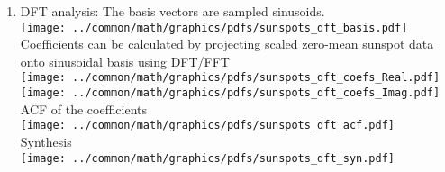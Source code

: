 \begin{example}
\begin{enumerate}
\item DFT analysis: The basis vectors are sampled sinusoids.
\\\texttt{[image: ../common/math/graphics/pdfs/sunspots\_dft\_basis.pdf]}
\\Coefficients can be calculated by projecting scaled zero-mean sunspot data onto sinusoidal basis using DFT/FFT
\\\texttt{[image: ../common/math/graphics/pdfs/sunspots\_dft\_coefs\_Real.pdf]}
\\\texttt{[image: ../common/math/graphics/pdfs/sunspots\_dft\_coefs\_Imag.pdf]}
\\ACF of the coefficients
\\\texttt{[image: ../common/math/graphics/pdfs/sunspots\_dft\_acf.pdf]}
\\Synthesis
\\\texttt{[image: ../common/math/graphics/pdfs/sunspots\_dft\_syn.pdf]}


\end{enumerate}
\end{example}
